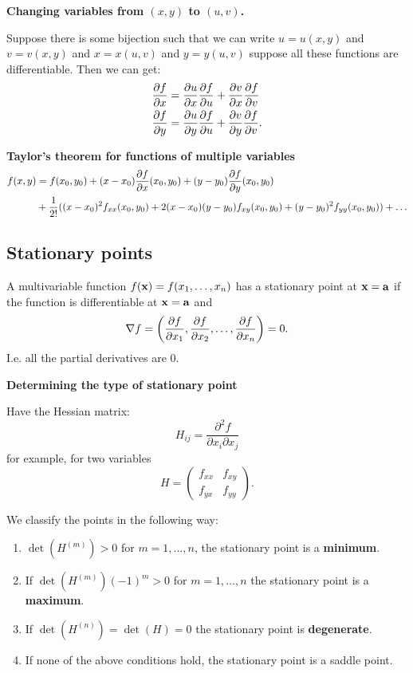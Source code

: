 \documentclass[10pt, a4paper]{article}
\begin{document}
\textbf{Changing variables from $(x, y)$ to $(u, v)$.}

Suppose there is some bijection such that we can write $u = u(x, y)$ and $v = v(x, y)$ and $x = x(u, v)$ and $y = y(u, v)$ suppose all these functions are differentiable.
Then we can get:
\begin{align*}
    \pd[f]{x} &= \pd[u]{x}\pd[f]{u} + \pd[v]{x}\pd[f]{v} \\
    \pd[f]{y} &= \pd[u]{y}\pd[f]{u} + \pd[v]{y}\pd[f]{v}.
\end{align*}

\textbf{Taylor's theorem for functions of multiple variables}
\begin{align*}
    f(x, y) &= f(x_0, y_0) + (x - x_0)\pd[f]{x}(x_0, y_0) + (y - y_0)\pd[f]{y}(x_0, y_0) \\
    &+ \frac{1}{2!}((x - x_0) ^ 2f_{xx}(x_0, y_0) + 2(x - x_0)(y - y_0)f_{xy}(x_0, y_0) + (y - y_0) ^ 2f_{yy}(x_0, y_0)) + \dotsc
\end{align*}

\subsection{Stationary points}

A multivariable function $f(\mbf{x}) = f(x_1, \dotsc, x_n)$ has a stationary point at $\mbf{x} = \mbf{a}$ if the function is differentiable at $\mbf{x} = \mbf{a}$ and
\[
\nabla f = \left(\pd[f]{x_1}, \pd[f]{x_2}, \dotsc, \pd[f]{x_n}\right) = 0.
\]
I.e. all the partial derivatives are $0$.

\textbf{Determining the type of stationary point}

Have the Hessian matrix:
\[
H_{ij} = \frac{\partial ^ 2f}{\partial x_i \partial x_j}
\]
for example,
for two variables
\[
H = \begin{pmatrix}
    f_{xx} & f_{xy} \\
    f_{yx} & f_{yy}
\end{pmatrix}.
\]

We classify the points in the following way:
\begin{enumerate}[label = (\arabic*)]
    \item $\det(H ^ {(m)}) > 0$ for $m = 1, \dotsc, n$,
    the stationary point is a \textbf{minimum}.

    \item If $\det(H ^ {(m)})(-1) ^ m > 0$ for $m = 1, \dotsc, n$ the stationary point is a \textbf{maximum}.

    \item If $\det(H ^ {(n)}) = \det(H) = 0$ the stationary point is \textbf{degenerate}.

    \item If none of the above conditions hold,
    the stationary point is a saddle point.
\end{enumerate}
\end{document}
